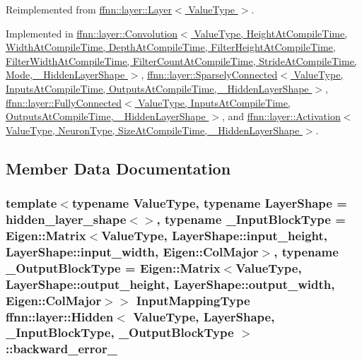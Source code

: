 Reimplemented from \hyperlink{classffnn_1_1layer_1_1_layer_a25bf06cfea93baf1c80e21d0a88a5e4a}{ffnn\-::layer\-::\-Layer$<$ Value\-Type $>$}.



Implemented in \hyperlink{classffnn_1_1layer_1_1_convolution_adda31ab384f91bba27443e19cf7c2dc5}{ffnn\-::layer\-::\-Convolution$<$ Value\-Type, Height\-At\-Compile\-Time, Width\-At\-Compile\-Time, Depth\-At\-Compile\-Time, Filter\-Height\-At\-Compile\-Time, Filter\-Width\-At\-Compile\-Time, Filter\-Count\-At\-Compile\-Time, Stride\-At\-Compile\-Time, Mode, \-\_\-\-Hidden\-Layer\-Shape $>$}, \hyperlink{classffnn_1_1layer_1_1_sparsely_connected_a5ddba33151a0bca81ec83cec819a14d8}{ffnn\-::layer\-::\-Sparsely\-Connected$<$ Value\-Type, Inputs\-At\-Compile\-Time, Outputs\-At\-Compile\-Time, \-\_\-\-Hidden\-Layer\-Shape $>$}, \hyperlink{classffnn_1_1layer_1_1_fully_connected_a7dd4dbe010c3d290c131b21b35f6301e}{ffnn\-::layer\-::\-Fully\-Connected$<$ Value\-Type, Inputs\-At\-Compile\-Time, Outputs\-At\-Compile\-Time, \-\_\-\-Hidden\-Layer\-Shape $>$}, and \hyperlink{classffnn_1_1layer_1_1_activation_a24a044458729f72466af06153851f5b2}{ffnn\-::layer\-::\-Activation$<$ Value\-Type, Neuron\-Type, Size\-At\-Compile\-Time, \-\_\-\-Hidden\-Layer\-Shape $>$}.



\subsection{Member Data Documentation}
\hypertarget{classffnn_1_1layer_1_1_hidden_a94312439d5029c9c779ff778f18f95a8}{
\subsubsection[{backward\-\_\-error\-\_\-}]{\setlength{\rightskip}{0pt plus 5cm}template$<$typename Value\-Type, typename Layer\-Shape = hidden\-\_\-layer\-\_\-shape$<$$>$, typename \-\_\-\-Input\-Block\-Type = Eigen\-::\-Matrix$<$\-Value\-Type, Layer\-Shape\-::input\-\_\-height,  Layer\-Shape\-::input\-\_\-width,  Eigen\-::\-Col\-Major$>$, typename \-\_\-\-Output\-Block\-Type = Eigen\-::\-Matrix$<$\-Value\-Type, Layer\-Shape\-::output\-\_\-height, Layer\-Shape\-::output\-\_\-width, Eigen\-::\-Col\-Major$>$$>$ {\bf Input\-Mapping\-Type} {\bf ffnn\-::layer\-::\-Hidden}$<$ Value\-Type, Layer\-Shape, \-\_\-\-Input\-Block\-Type, \-\_\-\-Output\-Block\-Type $>$\-::backward\-\_\-error\-\_\-\hspace{0.3cm}{\ttfamily [protected]}}}\label{classffnn_1_1layer_1_1_hidden_a94312439d5029c9c779ff778f18f95a8}


